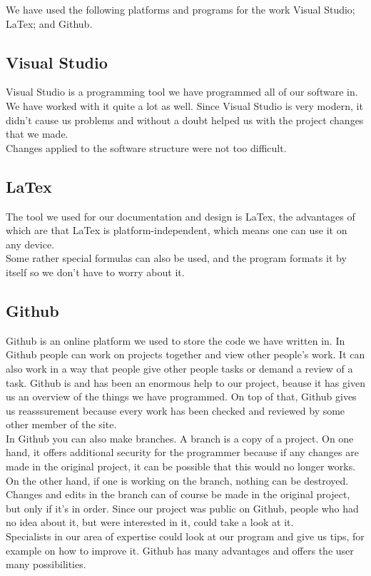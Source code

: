 We have used the following platforms and programs for the work  Visual Studio; LaTex; and Github.\\

\subsection {Visual Studio}

Visual Studio is a programming tool we have programmed all of our software in. We have worked with it quite a lot as well. Since Visual Studio is very modern, it didn't cause us problems and without a doubt helped us with the project changes that we made.\\
 Changes applied to the software structure were not too difficult.

\subsection {LaTex}

The tool we used for our documentation and design is LaTex, the advantages of which are that LaTex is platform-independent, which means one can use it on any device.\\
 Some rather special formulas can also be used, and the program formats it by itself so we don’t have to worry about it.

\subsection {Github}

Github is an online platform we used to store the code we have written in. In Github people can work on projects together and view other people's work. It can also work in a way that people give other people tasks or demand a review of a task. Github is and has been an enormous help to our project, beause it has given us an overview of the things we have programmed. On top of that, Github gives us reasssurement because every work has been checked and reviewed by some other member of the site. \\
In Github you can also make branches. A branch is a copy of a project. On one hand, it offers additional security for the programmer because if any changes are made in the original project, it can be possible that this would no longer works. On the other hand, if one is working on the branch, nothing can be destroyed. \\
Changes and edits in the branch can of course be made in the original project, but only if it's in order. Since our project was public on Github, people who had no idea about it, but were interested in it, could take a look at it. \\
Specialists in our area of expertise could look at our program and give us tips, for example on how to improve it. Github has many advantages and offers the user many possibilities.
